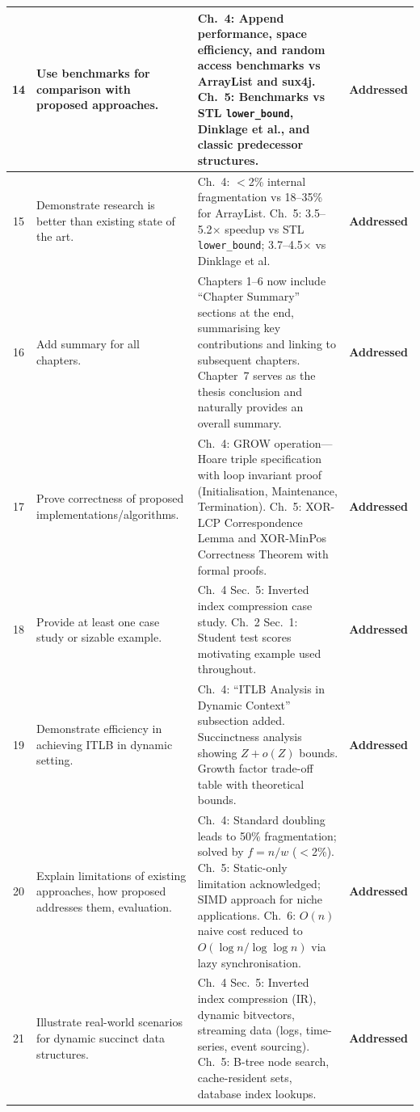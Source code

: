 \documentclass[12pt,a4paper]{article}
\newcommand{\addressed}{\textbf{Addressed}}
\begin{document}
\begin{longtable}{@{}c L{4.8cm} L{7.2cm} L{2.2cm}@{}}
14 &
Use benchmarks for comparison with proposed approaches. &
Ch.~4: Append performance, space efficiency, and random access benchmarks vs ArrayList and sux4j. Ch.~5: Benchmarks vs STL \texttt{lower\_bound}, Dinklage et al., and classic predecessor structures. &
\addressed \\
\midrule

15 &
Demonstrate research is better than existing state of the art. &
Ch.~4: $<$2\% internal fragmentation vs 18--35\% for ArrayList. Ch.~5: 3.5--5.2$\times$ speedup vs STL \texttt{lower\_bound}; 3.7--4.5$\times$ vs Dinklage et al. &
\addressed \\
\midrule

16 &
Add summary for all chapters. &
Chapters 1--6 now include ``Chapter Summary'' sections at the end, summarising key contributions and linking to subsequent chapters. Chapter~7 serves as the thesis conclusion and naturally provides an overall summary. &
\addressed \\
\midrule

17 &
Prove correctness of proposed implementations/algorithms. &
Ch.~4: GROW operation---Hoare triple specification with loop invariant proof (Initialisation, Maintenance, Termination). Ch.~5: XOR-LCP Correspondence Lemma and XOR-MinPos Correctness Theorem with formal proofs. &
\addressed \\
\midrule

18 &
Provide at least one case study or sizable example. &
Ch.~4 Sec.~5: Inverted index compression case study. Ch.~2 Sec.~1: Student test scores motivating example used throughout. &
\addressed \\
\midrule

19 &
Demonstrate efficiency in achieving ITLB in dynamic setting. &
Ch.~4: ``ITLB Analysis in Dynamic Context'' subsection added. Succinctness analysis showing $Z + o(Z)$ bounds. Growth factor trade-off table with theoretical bounds. &
\addressed \\
\midrule

20 &
Explain limitations of existing approaches, how proposed addresses them, evaluation. &
Ch.~4: Standard doubling leads to 50\% fragmentation; solved by $f=n/w$ ($<$2\%). Ch.~5: Static-only limitation acknowledged; SIMD approach for niche applications. Ch.~6: $O(n)$ naive cost reduced to $O(\log n / \log \log n)$ via lazy synchronisation. &
\addressed \\
\midrule

21 &
Illustrate real-world scenarios for dynamic succinct data structures. &
Ch.~4 Sec.~5: Inverted index compression (IR), dynamic bitvectors, streaming data (logs, time-series, event sourcing). Ch.~5: B-tree node search, cache-resident sets, database index lookups. &
\addressed \\
\midrule


\end{longtable}
\end{document}
